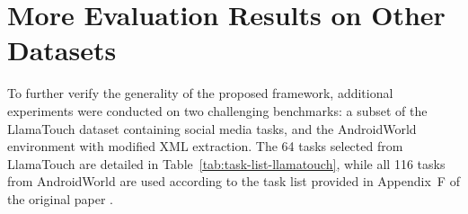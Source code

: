 \section{More Evaluation Results on Other Datasets}
\label{sec:appendix-more-eval}

To further verify the generality of the proposed framework, additional experiments were conducted on two challenging benchmarks: a subset of the LlamaTouch \citep{zhang2024llamatouch} dataset containing social media tasks, and the AndroidWorld \citep{rawles2024androidworld} environment with modified XML extraction. The 64 tasks selected from LlamaTouch are detailed in Table~\ref{tab:task-list-llamatouch}, while all 116 tasks from AndroidWorld are used according to the task list provided in Appendix~F of the original paper \citep{rawles2024androidworld}.

